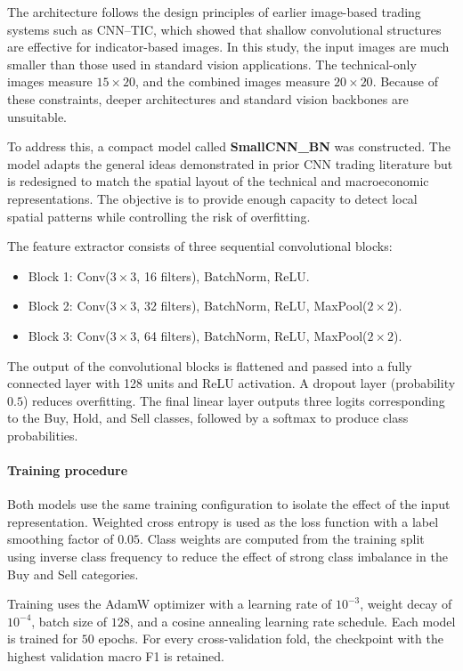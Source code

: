 The architecture follows the design principles of earlier image-based trading systems such as CNN--TIC, which showed that shallow convolutional structures are effective for indicator-based images. In this study, the input images are much smaller than those used in standard vision applications. The technical-only images measure $15 \times 20$, and the combined images measure $20 \times 20$. Because of these constraints, deeper architectures and standard vision backbones are unsuitable.

To address this, a compact model called \textbf{SmallCNN\_BN} was constructed. The model adapts the general ideas demonstrated in prior CNN trading literature but is redesigned to match the spatial layout of the technical and macroeconomic representations. The objective is to provide enough capacity to detect local spatial patterns while controlling the risk of overfitting.

The feature extractor consists of three sequential convolutional blocks:

\begin{itemize}
	\item Block 1: Conv($3 \times 3$, 16 filters), BatchNorm, ReLU.
	\item Block 2: Conv($3 \times 3$, 32 filters), BatchNorm, ReLU, MaxPool($2 \times 2$).
	\item Block 3: Conv($3 \times 3$, 64 filters), BatchNorm, ReLU, MaxPool($2 \times 2$).
\end{itemize}

The output of the convolutional blocks is flattened and passed into a fully connected layer with 128 units and ReLU activation. A dropout layer (probability $0.5$) reduces overfitting. The final linear layer outputs three logits corresponding to the Buy, Hold, and Sell classes, followed by a softmax to produce class probabilities.

\paragraph{Training procedure}

Both models use the same training configuration to isolate the effect of the input representation. Weighted cross entropy is used as the loss function with a label smoothing factor of $0.05$. Class weights are computed from the training split using inverse class frequency to reduce the effect of strong class imbalance in the Buy and Sell categories.

Training uses the AdamW optimizer with a learning rate of $10^{-3}$, weight decay of $10^{-4}$, batch size of $128$, and a cosine annealing learning rate schedule. Each model is trained for $50$ epochs. For every cross-validation fold, the checkpoint with the highest validation macro F1 is retained.

